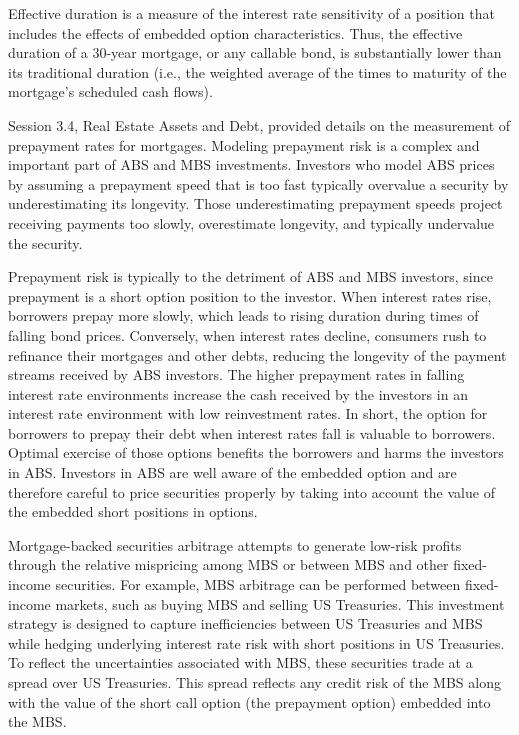 \documentclass[11pt]{article}
\begin{document}
Effective duration is a measure of the interest rate sensitivity of a position that includes the effects of embedded option characteristics. Thus, the effective duration of a 30-year mortgage, or any callable bond, is substantially lower than its traditional duration (i.e., the weighted average of the times to maturity of the mortgage's scheduled cash flows).

Session 3.4, Real Estate Assets and Debt, provided details on the measurement of prepayment rates for mortgages. Modeling prepayment risk is a complex and important part of ABS and MBS investments. Investors who model ABS prices by assuming a prepayment speed that is too fast typically overvalue a security by underestimating its longevity. Those underestimating prepayment speeds project receiving payments too slowly, overestimate longevity, and typically undervalue the security.

Prepayment risk is typically to the detriment of ABS and MBS investors, since prepayment is a short option position to the investor. When interest rates rise, borrowers prepay more slowly, which leads to rising duration during times of falling bond prices. Conversely, when interest rates decline, consumers rush to refinance their mortgages and other debts, reducing the longevity of the payment streams received by ABS investors. The higher prepayment rates in falling interest rate environments increase the cash received by the investors in an interest rate environment with low reinvestment rates. In short, the option for borrowers to prepay their debt when interest rates fall is valuable to borrowers. Optimal exercise of those options benefits the borrowers and harms the investors in ABS. Investors in ABS are well aware of the embedded option and are therefore careful to price securities properly by taking into account the value of the embedded short positions in options.

Mortgage-backed securities arbitrage attempts to generate low-risk profits through the relative mispricing among MBS or between MBS and other fixed-income securities. For example, MBS arbitrage can be performed between fixed-income markets, such as buying MBS and selling US Treasuries. This investment strategy is designed to capture inefficiencies between US Treasuries and MBS while hedging underlying interest rate risk with short positions in US Treasuries. To reflect the uncertainties associated with MBS, these securities trade at a spread over US Treasuries. This spread reflects any credit risk of the MBS along with the value of the short call option (the prepayment option) embedded into the MBS.
\end{document}
